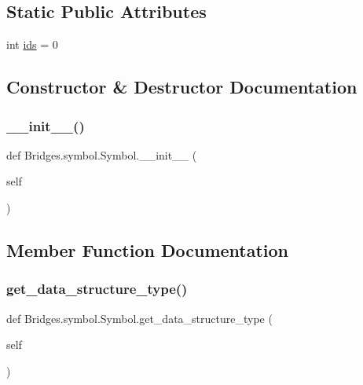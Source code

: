 \subsection*{Static Public Attributes}
\begin{DoxyCompactItemize}
\item 
int \mbox{\hyperlink{class_bridges_1_1symbol_1_1_symbol_a48d2d598cf3813125816475a69870bf5}{ids}} = 0
\end{DoxyCompactItemize}


\subsection{Constructor \& Destructor Documentation}
\mbox{\label{class_bridges_1_1symbol_1_1_symbol_a992996d7f32baa51d1d79ef490a7f118}} 
\subsubsection{\texorpdfstring{\+\_\+\+\_\+init\+\_\+\+\_\+()}{\_\_init\_\_()}}
{\footnotesize\ttfamily def Bridges.\+symbol.\+Symbol.\+\_\+\+\_\+init\+\_\+\+\_\+ (\begin{DoxyParamCaption}\item[{}]{self }\end{DoxyParamCaption})}



\subsection{Member Function Documentation}
\mbox{\label{class_bridges_1_1symbol_1_1_symbol_a75616da83e9f055698ad80f1dee77923}} 
\subsubsection{\texorpdfstring{get\+\_\+data\+\_\+structure\+\_\+type()}{get\_data\_structure\_type()}}
{\footnotesize\ttfamily def Bridges.\+symbol.\+Symbol.\+get\+\_\+data\+\_\+structure\+\_\+type (\begin{DoxyParamCaption}\item[{}]{self }\end{DoxyParamCaption})}

